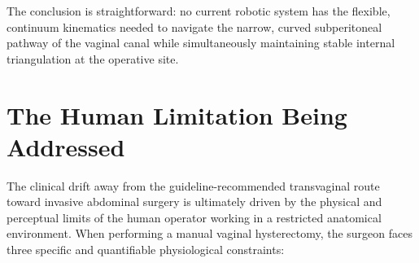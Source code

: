 \documentclass{article}
\begin{document}
The conclusion is straightforward: no current robotic system has the flexible, continuum kinematics needed to navigate the narrow, curved subperitoneal pathway of the vaginal canal while simultaneously maintaining stable internal triangulation at the operative site.

\section{The Human Limitation Being Addressed}

The clinical drift away from the guideline-recommended transvaginal route toward invasive abdominal surgery is ultimately driven by the physical and perceptual limits of the human operator working in a restricted anatomical environment. When performing a manual vaginal hysterectomy, the surgeon faces three specific and quantifiable physiological constraints:
\end{document}
